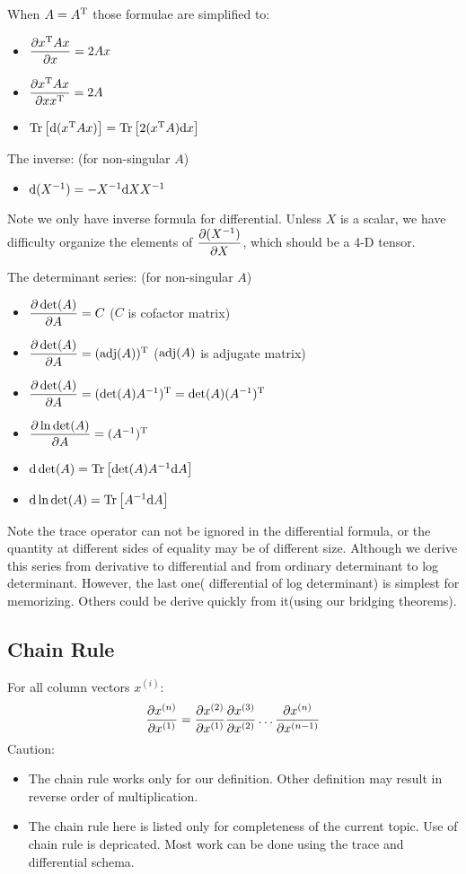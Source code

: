 When $A = A^\mathrm{T}$ those formulae are simplified to:
\begin{itemize}
	\item $\dfrac{\partial x^\mathrm{T} A x}{\partial x} = 2Ax$
	\item $\dfrac{\partial x^\mathrm{T} A x}{\partial x x^\mathrm{T}} = 2A$
	\item $\mathrm{Tr}\left[\mathrm{d}(x^\mathrm{T} A x)\right] = \mathrm{Tr}\left[2(x^\mathrm{T}A)\mathrm{d}x\right]$
\end{itemize}

The inverse: (for non-singular $A$)
\begin{itemize}
	\item $\mathrm{d}(X^{-1})=-X^{-1} \mathrm{d}X X^{-1}  $
\end{itemize}
Note we only have inverse formula for differential. Unless
$X$ is a scalar, we have difficulty organize the elements of 
$\dfrac{\partial (X^{-1})}{\partial X}$, which should be a 4-D tensor. 

The determinant series: (for non-singular $A$)
\begin{itemize}
	\item $\dfrac{\partial \det(A)}{\partial A}=C$ ($C$ is cofactor matrix)
	\item $\dfrac{\partial \det(A)}{\partial A}=(\mathrm{adj}(A))^\mathrm{T}$ ($\mathrm{adj}(A)$ is adjugate matrix)
	\item $\dfrac{\partial \det(A)}{\partial A} = (\det(A)A^{-1})^\mathrm{T} =\det(A)(A^{-1})^\mathrm{T}$
	\item $\dfrac{\partial \ln \det(A)}{\partial A} = (A^{-1})^\mathrm{T}$
	\item $\mathrm{d}\det(A)=\mathrm{Tr}\left[ \det(A)A^{-1}  \mathrm{d}A\right]$
	\item $\mathrm{d}\ln \det(A) = \mathrm{Tr}\left[ A^{-1}  \mathrm{d}A\right]$
\end{itemize}
Note the trace operator can not be ignored in the differential formula, 
or the quantity at different sides of equality may be of different size. 
Although we derive this series from derivative to differential and from 
ordinary determinant to log determinant. However, the last one(
differential of log determinant) is simplest for memorizing. Others 
could be derive quickly from it(using our bridging theorems). 

\subsection{Chain Rule}
For all column vectors $x^{(i)}$: 
\begin{equation}
	\dfrac{\partial x^{(n)}}{\partial x^{(1)}} = \dfrac{\partial x^{(2)}}{\partial x^{(1)}}
	\dfrac{\partial x^{(3)}}{\partial x^{(2)}} \ldots \dfrac{\partial x^{(n)}}{\partial x^{(n-1)}}
\end{equation}
Caution:
\begin{itemize}
	\item The chain rule works only for our definition. Other 
	definition may result in reverse order of multiplication. 
	\item The chain rule here is listed only for completeness 
	of the current topic. Use of chain rule is depricated. 
	Most work can be done using the trace and differential schema.  
\end{itemize}

